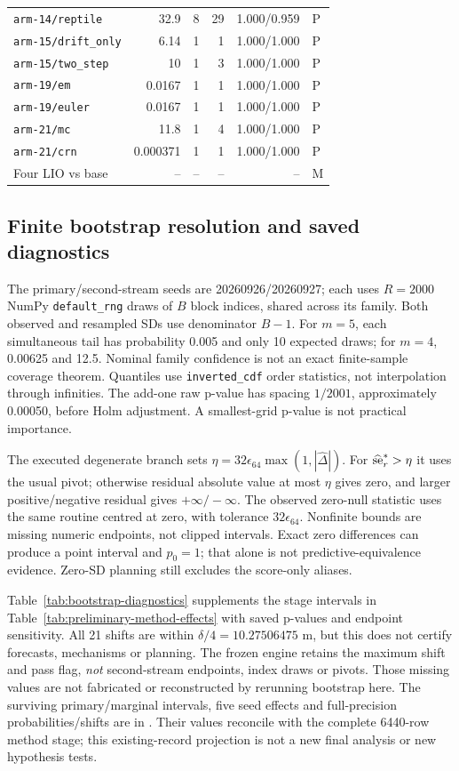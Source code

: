 \documentclass[11pt]{article}
\begin{document}
\begin{longtable}{lrrrrl}
\texttt{arm-14/reptile} & 32.9 & 8 & 29 & 1.000/0.959 & P\\
\texttt{arm-15/drift\_only} & 6.14 & 1 & 1 & 1.000/1.000 & P\\
\texttt{arm-15/two\_step} & 10 & 1 & 3 & 1.000/1.000 & P\\
\texttt{arm-19/em} & 0.0167 & 1 & 1 & 1.000/1.000 & P\\
\texttt{arm-19/euler} & 0.0167 & 1 & 1 & 1.000/1.000 & P\\
\texttt{arm-21/mc} & 11.8 & 1 & 4 & 1.000/1.000 & P\\
\texttt{arm-21/crn} & 0.000371 & 1 & 1 & 1.000/1.000 & P\\
Four LIO vs base & -- & -- & -- & -- & M\\
\end{longtable}

\subsection{Finite bootstrap resolution and saved diagnostics}
\label{sec:bootstrap-resolution}
The primary/second-stream seeds are 20260926/20260927; each uses \(R=2000\)
NumPy \texttt{default\_rng} draws of \(B\) block indices, shared across its
family. Both observed and resampled SDs use denominator \(B-1\).
For \(m=5\), each simultaneous tail has probability 0.005 and only 10
expected draws; for \(m=4\), 0.00625 and 12.5. Nominal family confidence
is not an exact finite-sample coverage theorem. Quantiles use
\texttt{inverted\_cdf} order statistics, not interpolation through infinities.
The add-one raw p-value has spacing \(1/2001\), approximately 0.00050,
before Holm adjustment. A smallest-grid p-value is not practical importance.

The executed degenerate branch sets
\(\eta=32\epsilon_{64}\max(1,|\widehat\Delta|)\). For
\(\widehat{\rm se}_r^*>\eta\) it uses the usual pivot; otherwise residual
absolute value at most \(\eta\) gives zero, and larger positive/negative
residual gives \(+\infty/-\infty\). The observed zero-null statistic uses
the same routine centred at zero, with tolerance \(32\epsilon_{64}\).
Nonfinite bounds are missing numeric endpoints, not clipped intervals.
Exact zero differences can produce a point interval and \(p_0=1\);
that alone is not predictive-equivalence evidence. Zero-SD planning still
excludes the score-only aliases.

Table~\ref{tab:bootstrap-diagnostics} supplements the stage intervals in
Table~\ref{tab:preliminary-method-effects} with saved p-values and endpoint
sensitivity. All 21 shifts are within \(\delta/4=10.27506475\) m, but this
does not certify forecasts, mechanisms or planning. The frozen engine
retains the maximum shift and pass flag, \emph{not} second-stream endpoints,
index draws or pivots. Those missing values are not fabricated or reconstructed
by rerunning bootstrap here. The surviving primary/marginal intervals,
five seed effects and full-precision probabilities/shifts are in
. Their values reconcile
with the complete 6440-row method stage; this existing-record projection
is not a new final analysis or new hypothesis tests.
\end{document}

